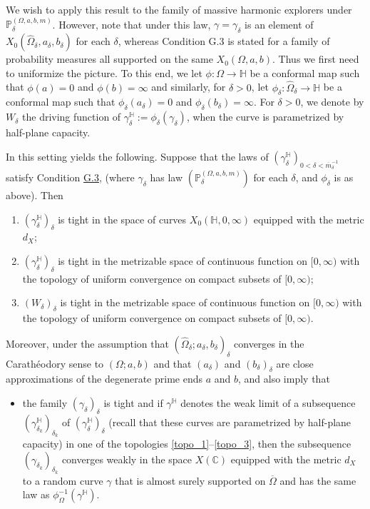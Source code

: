 \documentclass{article}
\newcommand{\PP}{{\mathbb{P}}}
\newcommand{\HH}{{\mathbb{H}}}
\theoremstyle{definition}
\theoremstyle{remark}
\theoremstyle{remark}
\begin{document}
We wish to apply this result to the family of massive harmonic explorers under $\PP_\delta^{(\Omega,a,b,m)}$. However, note that under this law, $\gamma=\gamma_\delta$ is an element of $X_0(\hat \Omega_\delta, a_\delta, b_\delta)$ for each $\delta$, whereas Condition G.3 is stated for a family of probability measures all supported on the same $X_0(\Omega, a, b)$. Thus we first need to uniformize the picture. To this end, we let $\phi: \Omega \to \mathbb{H}$ be a conformal map such that $\phi(a) = 0$ and $\phi(b)=\infty$ and similarly, for $\delta > 0$, let $\phi_{\delta}: \hat \Omega_{\delta} \to \mathbb{H}$ be a conformal map such that $\phi_{\delta}(a_{\delta}) = 0$ and $\phi_{\delta}(b_{\delta})=\infty$. For $\delta > 0$, we denote by $W_{\delta}$ the driving function of $\gamma_{\delta}^{\HH}:= \phi_{\delta}(\gamma_{\delta})$, when the curve is parametrized by half-plane capacity. 

In this setting \cite[Theorem~1.7]{Smirnov} yields the following. Suppose that the laws of $(\gamma_\delta^{\HH})_{0<\delta<\overline{m}_\delta^{-1}}$  satisfy Condition \hyperref[condG3]{G.3}, (where $\gamma_\delta$ has law  $(\PP_{\delta}^{(\Omega,a,b,m)})$ for each $\delta$, and $\phi_\delta$ is as above). Then 
\begin{enumerate}[label=\text{T.\arabic*},ref=T.\arabic*]
    \item \label{topo_1} $(\gamma_{\delta}^{\HH})_{\delta}$ is tight in the space of curves $X_0(\HH,0,\infty)$ equipped with the metric $d_X$;
    \item \label{topo_2} $(\gamma_{\delta}^{\HH})_{\delta}$ is tight in the metrizable space of continuous function on $[0, \infty)$ with the topology of uniform convergence on compact subsets of $[0, \infty)$;
    \item \label{topo_3} $(W_{\delta})_{\delta}$ is tight in the metrizable space of continuous function on $[0, \infty)$ with the topology of uniform convergence on compact subsets of $[0, \infty)$.
\end{enumerate}
Moreover, under the assumption that $(\hat \Omega_{\delta}; a_{\delta}, b_{\delta})_{\delta}$ converges in the Carath\'eodory sense to $(\Omega;a,b)$ and that $(a_{\delta})$ and $(b_{\delta})_{\delta}$ are close approximations of the degenerate prime ends $a$ and $b$, \cite[Corollary~1.8]{Smirnov} and \cite[Theorem~4.2]{Karrila} also imply that
\begin{itemize}
    \item the family $(\gamma_{\delta})_{\delta}$ is tight and if $\gamma^{\HH}$ denotes the weak limit of a subsequence $(\gamma_{\delta_k}^{\HH})_{\delta_k}$ of $(\gamma_{\delta}^{\HH})_{\delta}$ (recall that these curves are parametrized by half-plane capacity) in one of the topologies \eqref{topo_1}--\eqref{topo_3}, then the subsequence $(\gamma_{\delta_k})_{\delta_k}$ converges weakly in the space $X(\mathbb{C})$ equipped with the metric $d_X$ to a random curve $\gamma$ that is almost surely supported on $\overline{\Omega}$ and has the same law as $\phi_{\Omega}^{-1}(\gamma^{\HH})$.
\end{itemize}
\end{document}
